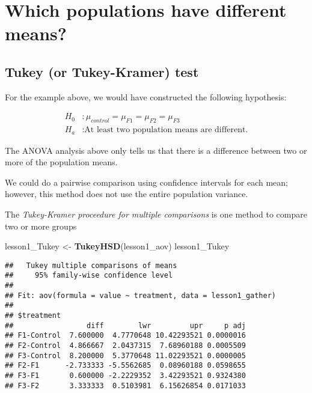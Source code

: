 \documentclass[]{book}
\newenvironment{Shaded}{\begin{snugshade}}{\end{snugshade}}
\newcommand{\KeywordTok}[1]{\textcolor[rgb]{0.13,0.29,0.53}{\textbf{#1}}}
\newcommand{\NormalTok}[1]{#1}
\newcommand{\StringTok}[1]{\textcolor[rgb]{0.31,0.60,0.02}{#1}}
\theoremstyle{definition}
\theoremstyle{definition}
\theoremstyle{definition}
\theoremstyle{remark}
\begin{document}
\hypertarget{which-populations-have-different-means}{%
\section{Which populations have different
means?}\label{which-populations-have-different-means}}

\hypertarget{tukey-or-tukey-kramer-test}{%
\subsection{Tukey (or Tukey-Kramer)
test}\label{tukey-or-tukey-kramer-test}}

For the example above, we would have constructed the following
hypothesis:

\[ \begin{aligned}
H_0 &:  \mu_{control} = \mu_{F1} = \mu_{F2} = \mu_{F3} \\
H_a &:  \text{At least two population means are different.}
\end{aligned} \]

The ANOVA analysis above only tells us that there is a difference
between two or more of the population means.

We could do a pairwise comparison using confidence intervals for each
mean; however, this method does not use the entire population variance.

The \emph{Tukey-Kramer proceedure for multiple comparisons} is one
method to compare two or more groups

\begin{Shaded}
\begin{Highlighting}[]
\NormalTok{lesson1_Tukey <-}\StringTok{ }\KeywordTok{TukeyHSD}\NormalTok{(lesson1_aov)}
\NormalTok{lesson1_Tukey}
\end{Highlighting}
\end{Shaded}

\begin{verbatim}
##   Tukey multiple comparisons of means
##     95% family-wise confidence level
## 
## Fit: aov(formula = value ~ treatment, data = lesson1_gather)
## 
## $treatment
##                 diff        lwr         upr     p adj
## F1-Control  7.600000  4.7770648 10.42293521 0.0000016
## F2-Control  4.866667  2.0437315  7.68960188 0.0005509
## F3-Control  8.200000  5.3770648 11.02293521 0.0000005
## F2-F1      -2.733333 -5.5562685  0.08960188 0.0598655
## F3-F1       0.600000 -2.2229352  3.42293521 0.9324380
## F3-F2       3.333333  0.5103981  6.15626854 0.0171033
\end{verbatim}
\end{document}
